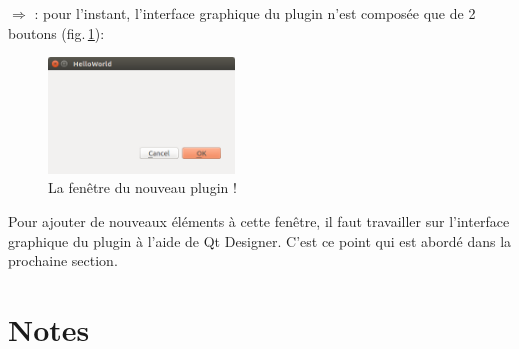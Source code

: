 \documentclass[11pt]{article}
\begin{document}
\begin{enumerate}
$\Rightarrow$ \underline{}: pour l'instant, l'interface graphique du plugin n'est composée que de 2 boutons (fig.\,\ref{plugin_buttons}):

\vspace*{-0.8em}
\begin{figure}[H]
    \centering
    \includegraphics[width=0.44\textwidth]{hello2018.png}
    \vspace*{-0.8em}
    \caption{La fenêtre du nouveau plugin !}
    \label{plugin_buttons}
\end{figure}
\vspace*{-0.64em}

Pour ajouter de nouveaux éléments à cette fenêtre, il faut travailler sur l'interface graphique du plugin à l'aide de Qt Designer. C'est ce point qui est abordé dans la prochaine section.

\end{enumerate}


\section*{Notes}
\hrulefill
\vspace*{1.6em}

\hrulefill
\vspace*{1.6em}

\hrulefill
\vspace*{1.6em}

\hrulefill
\vspace*{1.6em}

\hrulefill
\vspace*{1.6em}

\hrulefill
\vspace*{1.6em}

\hrulefill
\vspace*{1.6em}

\hrulefill
\vspace*{1.6em}

\hrulefill
\vspace*{1.6em}

\hrulefill
\vspace*{1.6em}
\end{document}

